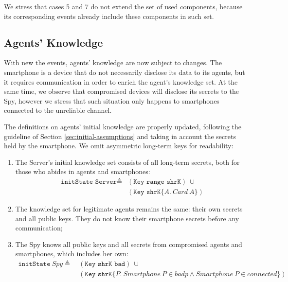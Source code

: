We stress that cases 5 and 7 do not extend the set of used components, because its corresponding events already include these components in such set.





\subsection{Agents' Knowledge}
With new the events, agents' knowledge are now subject to changes. The smartphone is a device that do not necessarily disclose its data to its agents, but it requires communication in order to enrich the agent's knowledge set. At the same time, we observe that compromised devices will disclose its secrets to the Spy, however we stress that such situation only happens to smartphones connected to the unreliable channel.

The definitions on agents' initial knowledge are properly updated, following the guideline of Section \ref{sec:initial-assumptions} and taking in account the secrets held by the smartphone. We omit asymmetric long-term keys for readability:
%
\begin{enumerate}
  \item The Server's initial knowledge set consists of all long-term secrets, both for those who abides in agents and smartphones:
  \begin{equation*}
    \begin{split}
      \texttt{initState Server} \triangleq
      & (\texttt{Key range shrK}) \ \cup \\
      & (\texttt{Key shrK}\{A.\ Card\ A\})
    \end{split}
  \end{equation*}
  \item The knowledge set for legitimate agents remains the same: their own secrets and all public keys. They do not know their smartphone secrets before any communication;

  \item The Spy knows all public keys and all secrets from compromised agents and smartphones, which includes her own:
  \begin{equation*}
    \begin{split}
      \texttt{initState}\ Spy \triangleq\
      & (\texttt{Key shrK bad}) \ \cup \\
      & (\texttt{Key shrK}\{P.\ Smartphone\ P \in badp \wedge Smartphone\ P \in connected\})
    \end{split}
  \end{equation*}
\end{enumerate}

